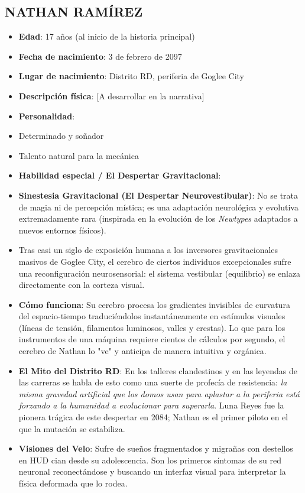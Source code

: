 \documentclass[11pt,a4paper]{report}
\begin{document}
\subsection{NATHAN RAMÍREZ}
\begin{itemize}
  \item \textbf{Edad}: 17 años (al inicio de la historia principal)
  \item \textbf{Fecha de nacimiento}: 3 de febrero de 2097
  \item \textbf{Lugar de nacimiento}: Distrito RD, periferia de Goglee City
  \item \textbf{Descripción física}: [A desarrollar en la narrativa]
  \item \textbf{Personalidad}: 
  \item Determinado y soñador
  \item Talento natural para la mecánica
  \item \textbf{Habilidad especial / El Despertar Gravitacional}:
  \item \textbf{Sinestesia Gravitacional (El Despertar Neurovestibular)}: No se trata de magia ni de percepción mística; es una adaptación neurológica y evolutiva extremadamente rara (inspirada en la evolución de los \textit{Newtypes} adaptados a nuevos entornos físicos). 
  \item Tras casi un siglo de exposición humana a los inversores gravitacionales masivos de Goglee City, el cerebro de ciertos individuos excepcionales sufre una reconfiguración neurosensorial: el sistema vestibular (equilibrio) se enlaza directamente con la corteza visual.
  \item \textbf{Cómo funciona}: Su cerebro procesa los gradientes invisibles de curvatura del espacio-tiempo traduciéndolos instantáneamente en estímulos visuales (líneas de tensión, filamentos luminosos, valles y crestas). Lo que para los instrumentos de una máquina requiere cientos de cálculos por segundo, el cerebro de Nathan lo "ve" y anticipa de manera intuitiva y orgánica.
  \item \textbf{El Mito del Distrito RD}: En los talleres clandestinos y en las leyendas de las carreras se habla de esto como una suerte de profecía de resistencia: \textit{la misma gravedad artificial que los domos usan para aplastar a la periferia está forzando a la humanidad a evolucionar para superarla}. Luna Reyes fue la pionera trágica de este despertar en 2084; Nathan es el primer piloto en el que la mutación se estabiliza.
  \item \textbf{Visiones del Velo}: Sufre de sueños fragmentados y migrañas con destellos en HUD cian desde su adolescencia. Son los primeros síntomas de su red neuronal reconectándose y buscando un interfaz visual para interpretar la física deformada que lo rodea.

\end{itemize}
\end{document}

